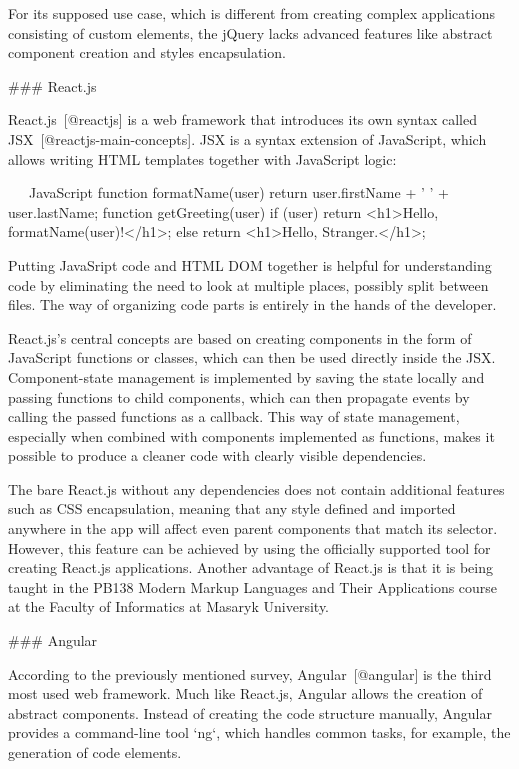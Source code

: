 \documentclass[
  digital, %
  oneside, %
  lof,     %
  nolot,     %
]{fithesis4}
\begin{document}
For its supposed use case, which is different from creating complex applications consisting of custom elements, the jQuery lacks advanced features like abstract component creation and styles encapsulation.

### React.js

React.js~[@reactjs] is a web framework that introduces its own syntax called JSX~[@reactjs-main-concepts]. JSX is a syntax extension of JavaScript, which allows writing HTML templates together with JavaScript logic:

~~~JavaScript
function formatName(user) {
  return user.firstName + ' ' + user.lastName;
}
function getGreeting(user) {
  if (user) return <h1>Hello, {formatName(user)}!</h1>;
  else return <h1>Hello, Stranger.</h1>;
}
~~~

Putting JavaSript code and HTML DOM together is helpful for understanding code by eliminating the need to look at multiple places, possibly split between files. The way of organizing code parts is entirely in the hands of the developer.

React.js's central concepts are based on creating components in the form of JavaScript functions or classes, which can then be used directly inside the JSX. Component-state management is implemented by saving the state locally and passing functions to child components, which can then propagate events by calling the passed functions as a callback. This way of state management, especially when combined with components implemented as functions, makes it possible to produce a cleaner code with clearly visible dependencies.

The bare React.js without any dependencies does not contain additional features such as CSS encapsulation, meaning that any style defined and imported anywhere in the app will affect even parent components that match its selector. However, this feature can be achieved by using the officially supported tool for creating React.js applications. Another advantage of React.js is that it is being taught in the PB138 Modern Markup Languages and Their Applications course at the Faculty of Informatics at Masaryk University.

### Angular

According to the previously mentioned survey, Angular~[@angular] is the third most used web framework. Much like React.js, Angular allows the creation of abstract components. Instead of creating the code structure manually, Angular provides a command-line tool `ng`, which handles common tasks, for example, the generation of code elements.
\end{document}

